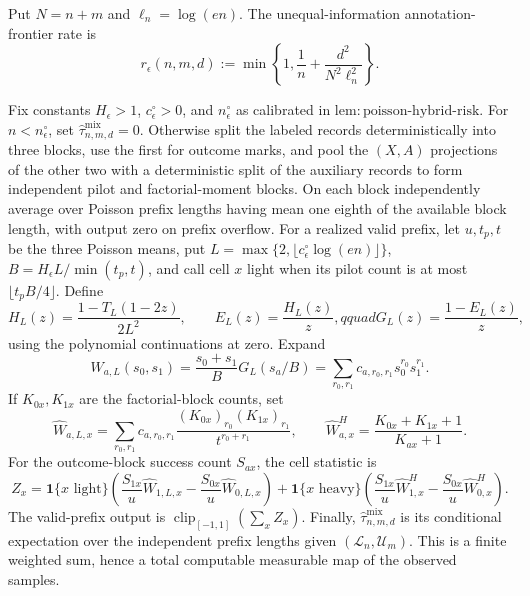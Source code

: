 Put \(N=n+m\) and \(\ell_n=\log(en)\).  The unequal-information annotation-frontier rate is
\[
r_\epsilon(n,m,d):=\min\!\left\{1,\frac1n+\frac{d^2}{N^2\ell_n^2}\right\}.
\]

Fix constants \(H_\epsilon>1\), \(c_\epsilon^\circ>0\), and \(n_\epsilon^\circ\) as calibrated in \(\mathrm{lem:poisson\mbox{-}hybrid\mbox{-}risk}\).  For \(n<n_\epsilon^\circ\), set \(\widehat\tau^{\mathrm{mix}}_{n,m,d}=0\).  Otherwise split the labeled records deterministically into three blocks, use the first for outcome marks, and pool the \((X,A)\) projections of the other two with a deterministic split of the auxiliary records to form independent pilot and factorial-moment blocks.  On each block independently average over Poisson prefix lengths having mean one eighth of the available block length, with output zero on prefix overflow.  For a realized valid prefix, let \(u,t_p,t\) be the three Poisson means, put \(L=\max\{2,\lfloor c_\epsilon^\circ\log(en)\rfloor\}\), \(B=H_\epsilon L/\min(t_p,t)\), and call cell \(x\) light when its pilot count is at most \(\lfloor t_pB/4\rfloor\).  Define
\[
 H_L(z)=\frac{1-T_L(1-2z)}{2L^2},\qquad E_L(z)=\frac{H_L(z)}z,qquad G_L(z)=\frac{1-E_L(z)}z,
\]
using the polynomial continuations at zero.  Expand
\[
 W_{a,L}(s_0,s_1)=\frac{s_0+s_1}{B}G_L(s_a/B)
   =\sum_{r_0,r_1}c_{a,r_0,r_1}s_0^{r_0}s_1^{r_1}.
\]
If \(K_{0x},K_{1x}\) are the factorial-block counts, set
\[
 \widehat W_{a,L,x}=\sum_{r_0,r_1}c_{a,r_0,r_1}
 \frac{(K_{0x})_{r_0}(K_{1x})_{r_1}}{t^{r_0+r_1}},
 \qquad
 \widehat W^H_{a,x}=\frac{K_{0x}+K_{1x}+1}{K_{ax}+1}.
\]
For the outcome-block success count \(S_{ax}\), the cell statistic is
\[
 Z_x=\mathbf 1\{x\text{ light}\}\left(\frac{S_{1x}}u\widehat W_{1,L,x}-\frac{S_{0x}}u\widehat W_{0,L,x}\right)
 +\mathbf 1\{x\text{ heavy}\}\left(\frac{S_{1x}}u\widehat W^H_{1,x}-\frac{S_{0x}}u\widehat W^H_{0,x}\right).
\]
The valid-prefix output is \(\operatorname{clip}_{[-1,1]}(\sum_xZ_x)\).  Finally, \(\widehat\tau^{\mathrm{mix}}_{n,m,d}\) is its conditional expectation over the independent prefix lengths given \((\mathcal L_n,\mathcal U_m)\).  This is a finite weighted sum, hence a total computable measurable map of the observed samples.

